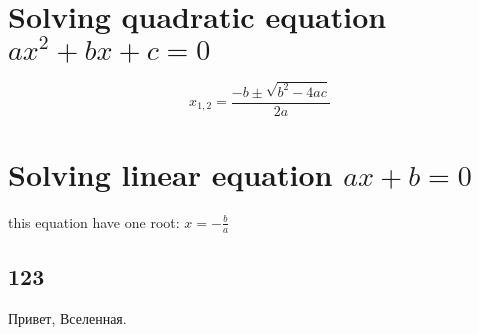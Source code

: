 \documentclass{article}
\author{You}
\begin{document}
\section{Solving quadratic equation $ax^2+bx+c=0$}


\begin{equation}
x_{1,2}=\frac{-b\pm\sqrt{b^2 - 4ac}}{2a}
\end{equation}
\section{Solving linear equation $ax+b=0$}
this equation have one root: 
$x = -\frac{b}{a}$
\subsection{123}
Привет, Вселенная.
\end{document}
